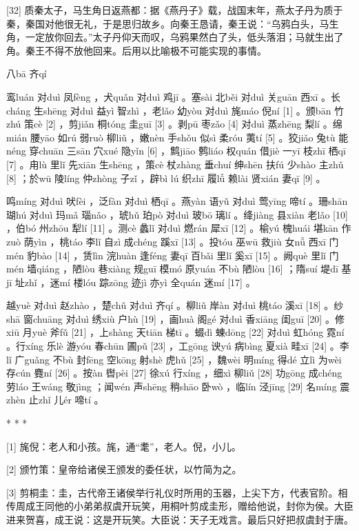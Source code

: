 \documentclass[12pt,UTF8]{ctexbook}
\begin{document}
[32] 质秦太子，马生角日返燕都：据《燕丹子》载，战国末年，燕太子丹为质于秦，秦国对他很无礼，于是思归故乡。向秦王恳请，秦王说：“乌鸦白头，马生角，一定放你回去。”太子丹仰天而叹，乌鸦果然白了头，低头落泪；马就生出了角。秦王不得不放他回来。后用以比喻极不可能实现的事情。





八bā 齐qí


鸾luán 对duì 凤fèng ，犬quǎn 对duì 鸡jī 。塞sài 北běi 对duì 关guān 西xī 。长cháng 生shēng 对duì 益yì 智zhì ，老lǎo 幼yòu 对duì 旄máo 倪ní [1] 。颁bān 竹zhú 策cè [2] ，剪jiǎn 桐tóng 圭guī [3] 。剥pū 枣zǎo [4] 对duì 蒸zhēng 梨lí 。绵mián 腰yāo 如rú 弱ruò 柳liǔ ，嫩nèn 手shǒu 似sì 柔róu 荑tí [5] 。狡jiǎo 兔tù 能néng 穿chuān 三sān 穴xué 隐yǐn [6] ，鹪jiāo 鹩liáo 权quán 借jiè 一yī 枝zhī 栖qī [7] 。甪lù 里lǐ 先xiān 生shēng ，策cè 杖zhàng 垂chuí 绅shēn 扶fú 少shào 主zhǔ [8] ；於wū 陵líng 仲zhòng 子zǐ ，辟bì lú 织zhī 履lǚ 赖lài 贤xián 妻qī [9] 。

鸣míng 对duì 吠fèi ，泛fàn 对duì 栖qī 。燕yàn 语yǔ 对duì 莺yīng 啼tí 。珊shān 瑚hú 对duì 玛mǎ 瑙nǎo ，琥hǔ 珀pò 对duì 玻bō 璃lí 。绛jiàng 县xiàn 老lǎo [10] ，伯bó 州zhōu 犁lí [11] 。测cè 蠡lǐ 对duì 燃rán 犀xī [12] 。榆yú 槐huái 堪kān 作zuò 荫yìn ，桃táo 李lǐ 自zì 成chéng 蹊xī [13] 。投tóu 巫wū 救jiù 女nǚ 西xī 门mén 豹bào [14] ，赁lìn 浣huàn 逢féng 妻qī 百bǎi 里lǐ 奚xī [15] 。阙què 里lǐ 门mén 墙qiáng ，陋lòu 巷xiàng 规guī 模mó 原yuán 不bù 陋lòu [16] ；隋suí 堤dī 基jī 址zhǐ ，迷mí 楼lóu 踪zōng 迹jì 亦yì 全quán 迷mí [17] 。

越yuè 对duì 赵zhào ，楚chǔ 对duì 齐qí 。柳liǔ 岸àn 对duì 桃táo 溪xī [18] 。纱shā 窗chuāng 对duì 绣xiù 户hù [19] ，画huà 阁gé 对duì 香xiāng 闺guī [20] 。修xiū 月yuè 斧fǔ [21] ，上shàng 天tiān 梯tī 。蝃dì 蝀dōng [22] 对duì 虹hóng 霓ní 。行xíng 乐lè 游yóu 春chūn 圃pǔ [23] ，工gōng 谀yú 病bìng 夏xià 畦xī [24] 。李lǐ 广guǎng 不bù 封fēng 空kōng 射shè 虎hǔ [25] ，魏wèi 明míng 得dé 立lì 为wèi 存cún 麑ní [26] 。按àn 辔pèi [27] 徐xú 行xíng ，细xì 柳liǔ [28] 功gōng 成chéng 劳láo 王wáng 敬jìng ；闻wén 声shēng 稍shāo 卧wò ，临lín 泾jīng [29] 名míng 震zhèn 止zhǐ 儿ér 啼tí 。



* * *



[1] 旄倪：老人和小孩。旄，通“耄”，老人。倪，小儿。

[2] 颁竹策：皇帝给诸侯王颁发的委任状，以竹简为之。

[3] 剪桐圭：圭，古代帝王诸侯举行礼仪时所用的玉器，上尖下方，代表官阶。相传周成王同他的小弟弟叔虞开玩笑，用桐叶剪成圭形，赠给他说，封你为侯。大臣进来贺喜，成王说：这是开玩笑。大臣说：天子无戏言。最后只好把叔虞封于唐。
\end{document}
